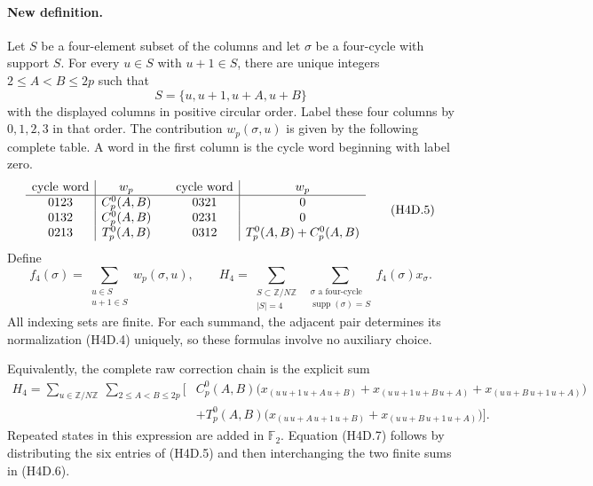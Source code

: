 \documentclass[11pt,oneside]{report}
\theoremstyle{definition}
\numberwithin{equation}{section}
\begin{document}
\paragraph{New definition.}
Let $S$ be a four-element subset of the columns and let $\sigma$ be
a four-cycle with support $S$. For every $u\in S$ with $u+1\in S$,
there are unique integers $2\leq A<B\leq2p$ such that
\[
                         S=\{u,u+1,u+A,u+B\}
 \tag{H4D.4}
\]
with the displayed columns in positive circular order.
Label these four columns by $0,1,2,3$
in that order. The contribution $w_p(\sigma,u)$ is given by the
following complete table. A word in the first column is the cycle
word beginning with label zero.
\[
\begin{array}{c|c@{\qquad}c|c}
 \text{cycle word}&w_p&\text{cycle word}&w_p\\\hline
 0123&C_p^0(A,B)&0321&0\\
 0132&C_p^0(A,B)&0231&0\\
 0213&T_p^0(A,B)&0312&T_p^0(A,B)+C_p^0(A,B)
\end{array}
 \tag{H4D.5}
\]
Define
\[
 f_4(\sigma)=\sum_{\substack{u\in S\\u+1\in S}}w_p(\sigma,u),
 \qquad
 H_4=\sum_{\substack{S\subset\mathbb Z/N\mathbb Z\\|S|=4}}
              \ \sum_{\substack{\sigma\text{ a four-cycle}\\
                                 \operatorname{supp}(\sigma)=S}}
                         f_4(\sigma)x_\sigma.
 \tag{H4D.6}
\]
All indexing sets are finite. For each summand, the adjacent pair
determines its normalization (H4D.4) uniquely, so these formulas
involve no auxiliary choice.

Equivalently, the complete raw correction chain is the explicit sum
\begin{align*}
 H_4=\sum_{u\in\mathbb Z/N\mathbb Z}\ \sum_{2\leq A<B\leq2p}
 \bigl[&C_p^0(A,B)
   \bigl(x_{(u\,u+1\,u+A\,u+B)}
        +x_{(u\,u+1\,u+B\,u+A)}
        +x_{(u\,u+B\,u+1\,u+A)}\bigr)\\
       &+T_p^0(A,B)
   \bigl(x_{(u\,u+A\,u+1\,u+B)}
        +x_{(u\,u+B\,u+1\,u+A)}\bigr)\bigr].
 \tag{H4D.7}
\end{align*}
Repeated states in this expression are added in $\mathbb F _2$.
Equation (H4D.7) follows by distributing the six entries of (H4D.5)
and then interchanging the two finite sums in (H4D.6).
\end{document}
